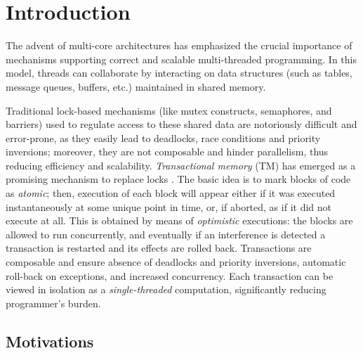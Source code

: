 
\chapter{Introduction}

The advent of multi-core architectures has emphasized the crucial importance of mechanisms supporting correct and scalable multi-threaded programming.
In this model, threads can collaborate by interacting on data structures (such as tables, message queues, buffers, etc.) maintained in shared memory.

Traditional lock-based mechanisms (like mutex constructs, semaphores, and barriers) used to regulate access to these shared data are notoriously difficult and error-prone, as they easily lead to deadlocks, race conditions and priority inversions; moreover, they are not composable and hinder parallelism, thus reducing efficiency and scalability.
\emph{Transactional memory} (TM) has emerged as a promising mechanism to replace locks \cite{moss:transactionalmemorybook,st:dc1997}.  The basic idea is to mark blocks of code as \emph{atomic}; then, execution of each block will appear either if it was executed instantaneously at some unique point in time, or, if aborted, as if it did not execute at all. This is obtained by means of \emph{optimistic} executions: the blocks are allowed to run concurrently, and eventually if an interference is detected a transaction is restarted and its effects are rolled back.
Transactions are composable and ensure absence of deadlocks and  priority inversions, automatic roll-back on exceptions, and increased concurrency.  Each transaction can be viewed in isolation as a \emph{single-threaded} computation, significantly reducing programmer's burden.

\section{Motivations}


